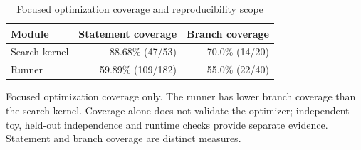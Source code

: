 \begin{table}[htbp]\centering\small
\caption{Focused optimization coverage and reproducibility scope}\label{tab:A3}
\begin{tabular}{lrr}
\toprule
Module & Statement coverage & Branch coverage \\
\midrule
Search kernel & 88.68\% (47/53) & 70.0\% (14/20) \\
Runner & 59.89\% (109/182) & 55.0\% (22/40) \\
\bottomrule
\end{tabular}
\par\smallskip
\begin{minipage}{\linewidth}\footnotesize Focused optimization coverage only. The runner has lower branch coverage than the search kernel. Coverage alone does not validate the optimizer; independent toy, held-out independence and runtime checks provide separate evidence. Statement and branch coverage are distinct measures.\end{minipage}
\end{table}
